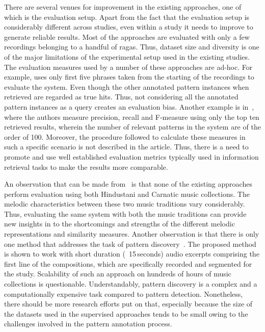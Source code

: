 {There are several venues for improvement in the existing approaches, one of which is the evaluation setup. Apart from the fact that the evaluation setup is considerably different across studies, even within a study it needs to improve to generate reliable results. Most of the approaches are evaluated with only a few recordings belonging to a handful of ragas. Thus, dataset size and diversity is one of the major limitations of the experimental setup used in the existing studies. The evaluation measures used by a number of these approaches are ad-hoc. For example, \cite{ganguli2015efficient} uses only first five phrases taken from the starting of the recordings to evaluate the system. Even though the other annotated pattern instances when retrieved are regarded as true hits. Thus, not considering all the annotated pattern instances as a query creates an evaluation bias. Another example is in~\cite{Ishwar2013}, where the authors measure precision, recall and F-measure using only the top ten retrieved results, wherein the number of relevant patterns in the system are of the order of 100. Moreover, the procedure followed to calculate these measures in such a specific scenario is not described in the article. Thus, there is a need to promote and use well established evaluation metrics typically used in information retrieval tasks to make the results more comparable. 

An observation that can be made from~ is that none of the existing approaches perform evaluation using both Hindustani and Carnatic music collections. The melodic characteristics between these two music traditions vary considerably. Thus, evaluating the same system with both the music traditions can provide new insights in to the shortcomings and strengths of the different melodic representations and similarity measures. Another observation is that there is only one method that addresses the task of pattern discovery~\cite{Dutta2014}. The proposed method is shown to work with short duration (~15\,seconds) audio excerpts comprising the first line of the compositions, which are specifically recorded and segmented for the study. Scalability of such an approach on hundreds of hours of music collections is questionable. Understandably, pattern discovery is a complex and a computationally expensive task compared to pattern detection. Nonetheless, there should be more research efforts put on that, especially because the size of the datasets used in the supervised approaches tends to be small owing to the challenges involved in the pattern annotation process. 

}
